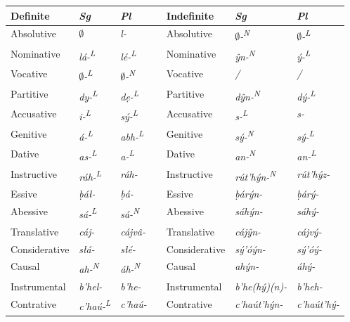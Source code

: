 \documentclass[a4paper, 12pt, twoside, openright, final]{book}
\let \nf \normalfont
\def \L {\textsuperscript{L}}
\def \N {\textsuperscript{N}}
\begin{document}
\noindent\begin{longtable}{l|>{\it}l|>{\it}lll|>{\it}l|>{\it}l}
Definite    &\nf Sg&\nf Pl && Indefinite       &\nf Sg&\nf Pl\\\cline{1-3}\cline{5-7}
\endhead
Absolutive    & $\emptyset$            & l-       && Absolutive    & $\emptyset$-\N       & $\emptyset$-\L  \\
Nominative    & lá-\L          & lé-\L    && Nominative    & ŷn-\N        & ý-\L    \\
Vocative      & $\emptyset$-\L         & $\emptyset$-\N   && Vocative      & /            & /       \\
Partitive     & dy-\L          & dẹ-\L    && Partitive     & dŷn-\N       & dý-\L   \\
Accusative    & i-\L           & sý-\L    && Accusative    & s-\L         & s-      \\
Genitive      & á-\L           & abh-\L   && Genitive      & sý-\N        & sý-\L   \\
Dative        & as-\L          & a-\L     && Dative        & an-\N        & an-\L   \\
Instructive   & ráh-\L         & ráh-     && Instructive   & rút’hýn-\N   & rút’hýz- \\\cline{1-3}\cline{5-7}

Essive        & ḅáł-           & ḅá-      && Essive        & ḅárýn-       & ḅárý-    \\
Abessive      & sá-\L          & sá-\N    && Abessive      & sáhýn-       & sáhý-    \\
Translative   & cáj-           & cájvâ-   && Translative   & cájŷn-       & cájvý-   \\ %
Considerative & słá-           & słé-     && Considerative & sý’óýn-      & sý’óý-   \\
Causal        & ah-\N          & áh-\N    && Causal        & ahýn-        & áhý-     \\ %
Instrumental  & b’hel-         & b’he-    && Instrumental  & b’he(hý)(n)- & b’heh-   \\
Contrative    & c’haú-\L       & c’haú-   && Contrative    & c’haút’hýn-  & c’haút’hý- \\\cline{1-3}\cline{5-7} %


\end{longtable}
\end{document}
